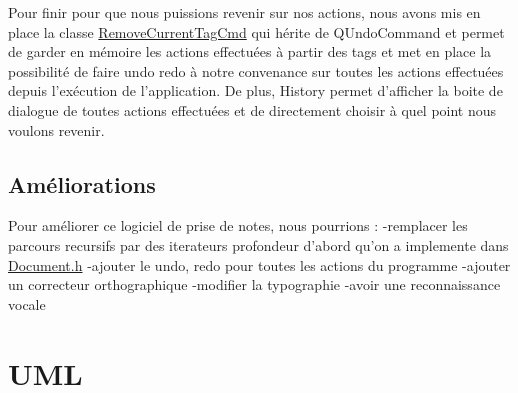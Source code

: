Pour finir pour que nous puissions revenir sur nos actions, nous avons mis en place la classe \hyperlink{class_remove_current_tag_cmd}{Remove\-Current\-Tag\-Cmd} qui hérite de Q\-Undo\-Command et permet de garder en mémoire les actions effectuées à partir des tags et met en place la possibilité de faire undo redo à notre convenance sur toutes les actions effectuées depuis l'exécution de l'application. De plus, History permet d'afficher la boite de dialogue de toutes actions effectuées et de directement choisir à quel point nous voulons revenir.\hypertarget{index_Améliorations}{}\subsection{Améliorations}\label{index_Améliorations}
Pour améliorer ce logiciel de prise de notes, nous pourrions \-: -\/remplacer les parcours recursifs par des iterateurs profondeur d'abord qu'on a implemente dans \hyperlink{_document_8h}{Document.\-h} -\/ajouter le undo, redo pour toutes les actions du programme -\/ajouter un correcteur orthographique -\/modifier la typographie -\/avoir une reconnaissance vocale\hypertarget{index_UML}{}\section{U\-M\-L}\label{index_UML}
 
